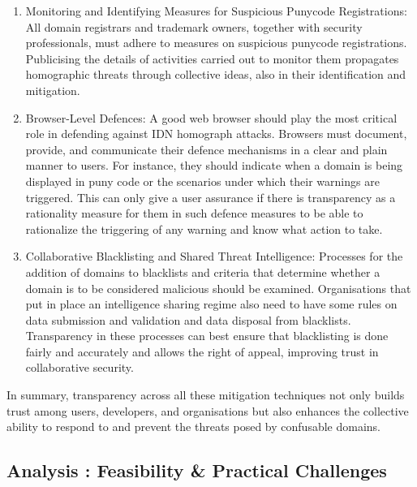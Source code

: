 \begin{itemize}
  \begin{enumerate}
  \item Monitoring and Identifying Measures for Suspicious Punycode Registrations: All domain registrars and trademark owners, together with security professionals, must adhere to measures on suspicious punycode registrations. Publicising the details of activities carried out to monitor them propagates homographic threats through collective ideas, also in their identification and mitigation.
  \item Browser-Level Defences: A good web browser should play the most critical role in defending against IDN homograph attacks. Browsers must document, provide, and communicate their defence mechanisms in a clear and plain manner to users. For instance, they should indicate when a domain is being displayed in puny code or the scenarios under which their warnings are triggered. This can only give a user assurance if there is transparency as a rationality measure for them in such defence measures to be able to rationalize the triggering of any warning and know what action to take.
  \item Collaborative Blacklisting and Shared Threat Intelligence: Processes for the addition of domains to blacklists and criteria that determine whether a domain is to be considered malicious should be examined. Organisations that put in place an intelligence sharing regime also need to have some rules on data submission and validation and data disposal from blacklists. Transparency in these processes can best ensure that blacklisting is done fairly and accurately and allows the right of appeal, improving trust in collaborative security.
\end{enumerate}
  
  
\end{itemize}

In summary, transparency across all these mitigation techniques not only builds trust among users, developers, and organisations but also enhances the collective ability to respond to and prevent the threats posed by confusable domains.


\subsection{ Analysis : Feasibility \& Practical Challenges}

